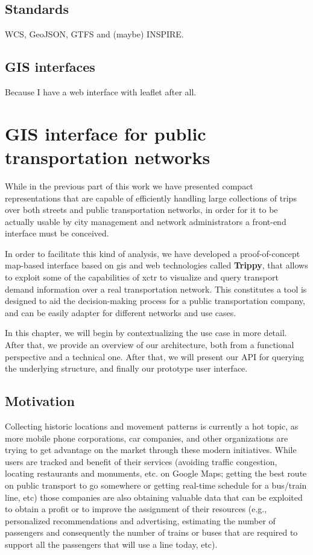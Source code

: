     \section{Standards}
    WCS, GeoJSON, GTFS and (maybe) INSPIRE.

    \section{GIS interfaces}
	Because I have a web interface with leaflet after all.

\chapter{GIS interface for public transportation networks}
\label{sec:gis}
	While in the previous part of this work we have presented compact representations that are capable of efficiently handling large collections of trips over both streets and public transportation networks, in order for it to be actually usable by city management and network administrators a front-end interface must be conceived.
	
	In order to facilitate this kind of analysis, we have developed a proof-of-concept map-based interface based on \gls{gis} and web technologies called \textbf{Trippy}, that allows to exploit some of the capabilities of \gls{xctr} to visualize and query transport demand information over a real transportation network. This constitutes a tool is designed to aid the decision-making process for a public transportation company, and can be easily adapter for different networks and use cases.
	
	In this chapter, we will begin by contextualizing the use case in more detail. After that, we provide an overview of our architecture, both from a functional perspective and a technical one. After that, we will present our API for querying the underlying structure, and finally our prototype user interface.
	
	\section{Motivation}
	\label{sec:gis:intro}
    Collecting historic locations and movement patterns is currently a hot topic, as more mobile phone corporations, car companies, and other organizations are trying to get advantage on the market through these modern initiatives. While users are tracked and benefit of their services (avoiding traffic congestion, locating restaurants and monuments, etc. on Google Maps; getting the best route on public transport to go somewhere or getting real-time schedule for a bus/train line, etc) those companies are also obtaining valuable data that can be exploited to obtain a profit or to improve the assignment of their resources (e.g., personalized recommendations and advertising, estimating the number of passengers and consequently the number of trains or buses that are required to support all the passengers that will use a line today, etc).
    
